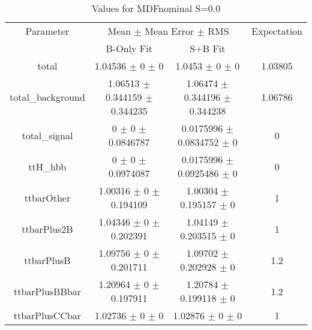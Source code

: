 \begin{table}
\centering
\caption{Values for MDFnominal S=0.0}
\begin{tabular}{cccc}
\toprule
Parameter & \multicolumn{2}{c}{Mean $\pm$ Mean Error $\pm$ RMS} & Expectation\\
 & B-Only Fit & S+B Fit & \\
\midrule
total & \num{1.04536} $\pm$ \num{0} $\pm$ \num{0} & \num{1.0453} $\pm$ \num{0} $\pm$ \num{0} & \num{1.03805}\\
total\_background & \num{1.06513} $\pm$ \num{0.344159} $\pm$ \num{0.344235} & \num{1.06474} $\pm$ \num{0.344196} $\pm$ \num{0.344238} & \num{1.06786}\\
total\_signal & \num{0} $\pm$ \num{0} $\pm$ \num{0.0846787} & \num{0.0175996} $\pm$ \num{0.0834752} $\pm$ \num{0} & \num{0}\\
ttH\_hbb & \num{0} $\pm$ \num{0} $\pm$ \num{0.0974087} & \num{0.0175996} $\pm$ \num{0.0925486} $\pm$ \num{0} & \num{0}\\
ttbarOther & \num{1.00316} $\pm$ \num{0} $\pm$ \num{0.194109} & \num{1.00304} $\pm$ \num{0.195157} $\pm$ \num{0} & \num{1}\\
ttbarPlus2B & \num{1.04346} $\pm$ \num{0} $\pm$ \num{0.202391} & \num{1.04149} $\pm$ \num{0.203515} $\pm$ \num{0} & \num{1}\\
ttbarPlusB & \num{1.09756} $\pm$ \num{0} $\pm$ \num{0.201711} & \num{1.09702} $\pm$ \num{0.202928} $\pm$ \num{0} & \num{1.2}\\
ttbarPlusBBbar & \num{1.20964} $\pm$ \num{0} $\pm$ \num{0.197911} & \num{1.20784} $\pm$ \num{0.199118} $\pm$ \num{0} & \num{1.2}\\
ttbarPlusCCbar & \num{1.02736} $\pm$ \num{0} $\pm$ \num{0} & \num{1.02876} $\pm$ \num{0} $\pm$ \num{0} & \num{1}\\
\bottomrule
\end{tabular}
\end{table}